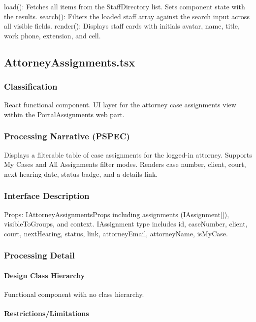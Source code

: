 \documentclass[12pt]{article}
\begin{document}
load(): Fetches all items from the StaffDirectory list. Sets component state with the results. search(): Filters the loaded staff array against the search input across all visible fields. render(): Displays staff cards with initials avatar, name, title, work phone, extension, and cell.

\subsection{AttorneyAssignments.tsx}

\subsubsection{Classification}

React functional component. UI layer for the attorney case assignments view within the PortalAssignments web part.

\subsubsection{Processing Narrative (PSPEC)}

Displays a filterable table of case assignments for the logged-in attorney. Supports My Cases and All Assignments filter modes. Renders case number, client, court, next hearing date, status badge, and a details link.

\subsubsection{Interface Description}

Props: IAttorneyAssignmentsProps including assignments (IAssignment[]), visibleToGroups, and context. IAssignment type includes id, caseNumber, client, court, nextHearing, status, link, attorneyEmail, attorneyName, isMyCase.

\subsubsection{Processing Detail}

\paragraph{Design Class Hierarchy}

Functional component with no class hierarchy.

\paragraph{Restrictions/Limitations}
\end{document}
